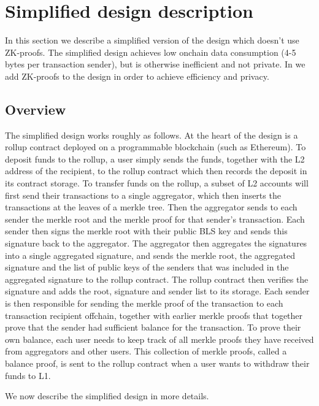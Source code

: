 \section{Simplified design description}\label{section:simplified-design}

In this section we describe a simplified version of the design which doesn't use ZK-proofs. The simplified design achieves low onchain data consumption (4-5 bytes per transaction sender), but is otherwise inefficient and not private. In  we add ZK-proofs to the design in order to achieve efficiency and privacy.

\subsection{Overview}

The simplified design works roughly as follows. At the heart of the design is a rollup contract deployed on a programmable blockchain (such as Ethereum). To deposit funds to the rollup, a user simply sends the funds, together with the L2 address of the recipient, to the rollup contract which then records the deposit in its contract storage. To transfer funds on the rollup, a subset of L2 accounts will first send their transactions to a single aggregator, which then inserts the transactions at the leaves of a merkle tree. Then the aggregator sends to each sender the merkle root and the merkle proof for that sender's transaction. Each sender then signs the merkle root with their public BLS key and sends this signature back to the aggregator. The aggregator then aggregates the signatures into a single aggregated signature, and sends the merkle root, the aggregated signature and the list of public keys of the senders that was included in the aggregated signature to the rollup contract. The rollup contract then verifies the signature and adds the root, signature and sender list to its storage. Each sender is then responsible for sending the merkle proof of the transaction to each transaction recipient offchain, together with earlier merkle proofs that together prove that the sender had sufficient balance for the transaction. To prove their own balance, each user needs to keep track of all merkle proofs they have received from aggregators and other users. This collection of merkle proofs, called a balance proof, is sent to the rollup contract when a user wants to withdraw their funds to L1.

We now describe the simplified design in more details.

